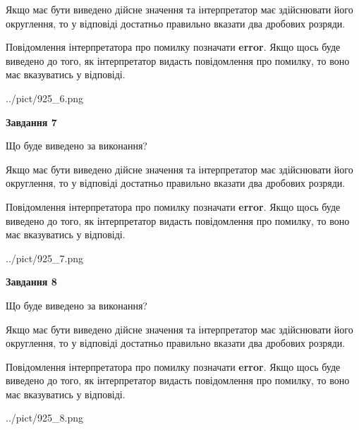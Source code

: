 \documentclass[12pt, ukrainian]{article}
\begin{document}
{\begin {Large}
Якщо має бути виведено дійсне значення та інтерпретатор має здійснювати його округлення, 
то у відповіді достатньо правильно вказати два дробових розряди.

Повідомлення інтерпретатора про помилку позначати \textbf{error}.
Якщо щось буде виведено до того, як інтерпретатор видасть повідомлення про помилку, 
то воно має вказуватись у відповіді. \par

\begin{center}
	{../pict/925_6.png}
\end{center}
\newpage

{\begin {center}\textbf{Завдання 7}\end {center}}\par
Що буде виведено за виконання? \par

Якщо має бути виведено дійсне значення та інтерпретатор має здійснювати його округлення, 
то у відповіді достатньо правильно вказати два дробових розряди.

Повідомлення інтерпретатора про помилку позначати \textbf{error}.
Якщо щось буде виведено до того, як інтерпретатор видасть повідомлення про помилку, 
то воно має вказуватись у відповіді. \par

\begin{center}
	{../pict/925_7.png}
\end{center}
\newpage

{\begin {center}\textbf{Завдання 8}\end {center}}\par
Що буде виведено за виконання? \par

Якщо має бути виведено дійсне значення та інтерпретатор має здійснювати його округлення, 
то у відповіді достатньо правильно вказати два дробових розряди.

Повідомлення інтерпретатора про помилку позначати \textbf{error}.
Якщо щось буде виведено до того, як інтерпретатор видасть повідомлення про помилку, 
то воно має вказуватись у відповіді. \par

\begin{center}
	{../pict/925_8.png}
\end{center}
\newpage


\end{Large}}
\end{document}
